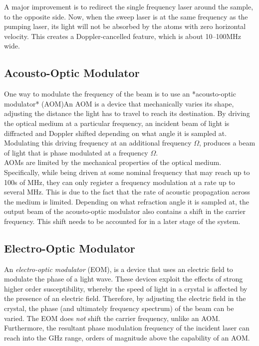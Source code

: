 A major improvement is to redirect the single frequency laser around the sample, to the opposite side.  Now, when the sweep laser is at the same frequency as the pumping laser, its light will not be absorbed by the atoms with zero horizontal velocity.  This creates a Doppler-cancelled feature, which is about 10--100MHz wide.

\subsection{Acousto-Optic Modulator}

One way to modulate the frequency of the beam is to use an *acousto-optic modulator* (AOM)An AOM is a device that mechanically varies its shape, adjusting the distance the light has to travel to reach its destination.  By driving the optical medium at a particular frequency, an incident beam of light is diffracted and Doppler shifted depending on what angle it is sampled at. Modulating this driving frequency at an additional frequency $\Omega$, produces a beam of light that is phase modulated at a frequency $\Omega$. \\

AOMs are limited by the mechanical properties of the optical medium. Specifically, while
being driven at some nominal frequency that may reach up to 100s of MHz, they can only register a frequency modulation at a rate up to several MHz. This is due to the fact that the rate of acoustic propagation across the medium is limited. Depending on what refraction angle it is sampled at, the output beam of the acousto-optic modulator also contains a shift in the carrier frequency.  This shift needs to be accounted for in a later stage of the system.

\subsection{Electro-Optic Modulator}

An \emph{electro-optic modulator} (EOM), is a device that uses an electric field to modulate the phase of a light wave.  These devices exploit the effects of strong higher order susceptibility, whereby the speed of light in a crystal is affected by the presence of an electric field.  Therefore, by adjusting the electric field in the crystal, the phase (and ultimately frequency spectrum) of the beam can be varied.  The EOM does \emph{not} shift the carrier frequency, unlike an AOM. Furthermore, the resultant phase modulation frequency
of the incident laser can reach into the GHz range, orders of magnitude above the
capability of an AOM.\\

